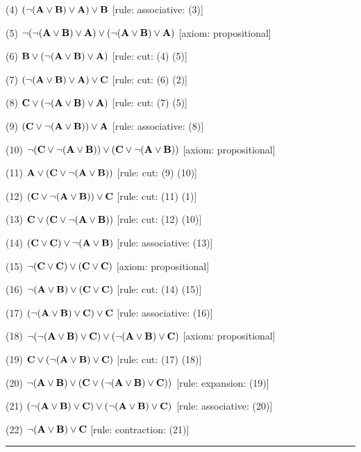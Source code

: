 \item{(4)} $(\neg ({\bf A} \lor {\bf B}) \lor {\bf A}) \lor {\bf B}$ \hfill [rule: associative: (3)]
\item{(5)} $\neg (\neg ({\bf A} \lor {\bf B}) \lor {\bf A}) \lor (\neg ({\bf A} \lor {\bf B}) \lor {\bf A})$ \hfill [axiom: propositional]
\item{(6)} ${\bf B} \lor (\neg ({\bf A} \lor {\bf B}) \lor {\bf A})$ \hfill [rule: cut: (4) (5)]
\item{(7)} $(\neg ({\bf A} \lor {\bf B}) \lor {\bf A}) \lor {\bf C}$ \hfill [rule: cut: (6) (2)]
\item{(8)} ${\bf C} \lor (\neg ({\bf A} \lor {\bf B}) \lor {\bf A})$ \hfill [rule: cut: (7) (5)]
\item{(9)} $({\bf C} \lor \neg ({\bf A} \lor {\bf B})) \lor {\bf A}$ \hfill [rule: associative: (8)]
\item{(10)} $\neg ({\bf C} \lor \neg ({\bf A} \lor {\bf B})) \lor ({\bf C} \lor \neg ({\bf A} \lor {\bf B}))$ \hfill [axiom: propositional]
\item{(11)} ${\bf A} \lor ({\bf C} \lor \neg ({\bf A} \lor {\bf B}))$ \hfill [rule: cut: (9) (10)]
\item{(12)} $({\bf C} \lor \neg ({\bf A} \lor {\bf B})) \lor {\bf C}$ \hfill [rule: cut: (11) (1)]
\item{(13)} ${\bf C} \lor ({\bf C} \lor \neg ({\bf A} \lor {\bf B}))$ \hfill [rule: cut: (12) (10)]
\item{(14)} $({\bf C} \lor {\bf C}) \lor \neg ({\bf A} \lor {\bf B})$ \hfill [rule: associative: (13)]
\item{(15)} $\neg ({\bf C} \lor {\bf C}) \lor ({\bf C} \lor {\bf C})$ \hfill [axiom: propositional]
\item{(16)} $\neg ({\bf A} \lor {\bf B}) \lor ({\bf C} \lor {\bf C})$ \hfill [rule: cut: (14) (15)]
\item{(17)} $(\neg ({\bf A} \lor {\bf B}) \lor {\bf C}) \lor {\bf C}$ \hfill [rule: associative: (16)]
\item{(18)} $\neg (\neg ({\bf A} \lor {\bf B}) \lor {\bf C}) \lor (\neg ({\bf A} \lor {\bf B}) \lor {\bf C})$ \hfill [axiom: propositional]
\item{(19)} ${\bf C} \lor (\neg ({\bf A} \lor {\bf B}) \lor {\bf C})$ \hfill [rule: cut: (17) (18)]
\item{(20)} $\neg ({\bf A} \lor {\bf B}) \lor ({\bf C} \lor (\neg ({\bf A} \lor {\bf B}) \lor {\bf C}))$ \hfill [rule: expansion: (19)]
\item{(21)} $(\neg ({\bf A} \lor {\bf B}) \lor {\bf C}) \lor (\neg ({\bf A} \lor {\bf B}) \lor {\bf C})$ \hfill [rule: associative: (20)]
\item{(22)} $\neg ({\bf A} \lor {\bf B}) \lor {\bf C}$ \hfill [rule: contraction: (21)]
\medskip
\hrule
\medskip
